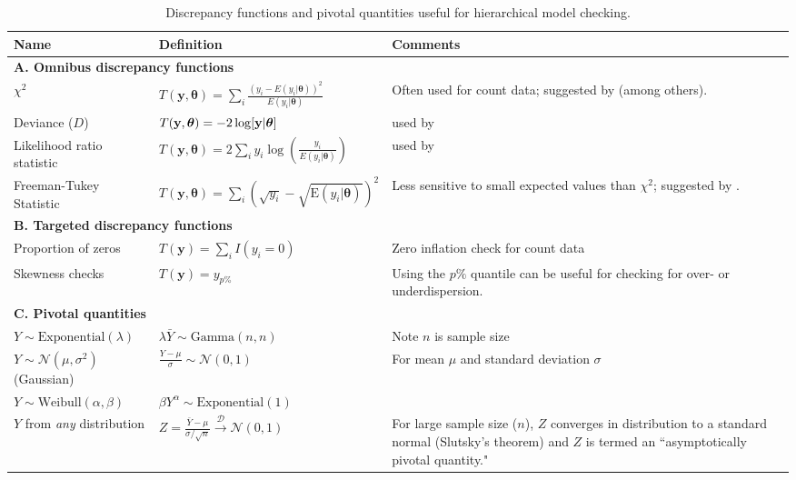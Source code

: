 \documentclass[12pt,english]{article}
\begin{document}
\begin{spacing}{1.9}
\begin{table}[ht]
\caption{Discrepancy functions and pivotal quantities useful for hierarchical model checking.
}
\label{tab:discrepancy}
\centering
\begin{tabular}{p{4cm}lp{5cm}}
  \hline
  Name & Definition & Comments \\
  \hline
  \multicolumn{3}{l}{\textbf{A. Omnibus discrepancy functions}} \\
  $\chi^2$ & $T(\textbf{y},\boldsymbol{\theta}) = \sum_i \frac{(y_i - E(y_i|\boldsymbol{\theta}))^2}{E(y_i|\boldsymbol{\theta})}$ & Often used for count data; suggested by \citet{GelmanEtAl2014} (among others).\\
  Deviance ($D$) &  $T(\textbf{y},\boldsymbol{\theta}) = -2 \log [{\bf y} | \boldsymbol{\theta}]$ & used by \citet{KingEtAl2009}\\
  Likelihood ratio statistic & $T(\textbf{y},\boldsymbol{\theta}) = 2 \sum_i y_i \log(\frac{y_i}{E(y_i|\boldsymbol{\theta})})$ & used by \citet{LunnEtAl2013} \\
  Freeman-Tukey Statistic & $T(\textbf{y},\boldsymbol{\theta})=\sum_i (\sqrt{y_i}-\sqrt{\textrm{E}(y_i|\boldsymbol{\theta})})^2$ & Less sensitive to small expected values than $\chi^2$; suggested by \citet{KeryRoyle2016}.\\
  \multicolumn{3}{l}{\textbf{B. Targeted discrepancy functions}} \\
  Proportion of zeros & $T(\textbf{y}) = \sum_i I(y_i = 0) $ & Zero inflation check for count data \\
  Skewness checks & $T(\textbf{y}) = y_{p\%} $ & Using the $p\%$ quantile can be useful for checking for over- or underdispersion. \\
  \multicolumn{3}{l}{\textbf{C. Pivotal quantities}} \\
  $Y  \sim \textrm{Exponential}(\lambda)$ & $\lambda \bar{Y} \sim \textrm{Gamma}(n,n)$ & Note $n$ is sample size\\
  $Y \sim \mathcal{N}(\mu,\sigma^2)$ (Gaussian) & $ \frac{Y - \mu}{\sigma} \sim \mathcal{N}(0,1) $ & For mean $\mu$ and standard deviation $\sigma$  \\
  $Y \sim \textrm{Weibull}(\alpha,\beta)$ & $ \beta Y^\alpha \sim \textrm{Exponential}(1) $ & \\
  $Y$ from {\it any} distribution & $Z = \frac{\bar{Y}-\mu}{\sigma/\sqrt{n}} \xrightarrow[]{\mathcal{D}} \mathcal{N}(0,1)$ & For large sample size ($n$), $Z$ converges in distribution to a standard normal (Slutsky's theorem) and $Z$ is termed an ``asymptotically pivotal quantity." \\
\hline
\end{tabular}
\end{table}



\end{spacing}
\end{document}
